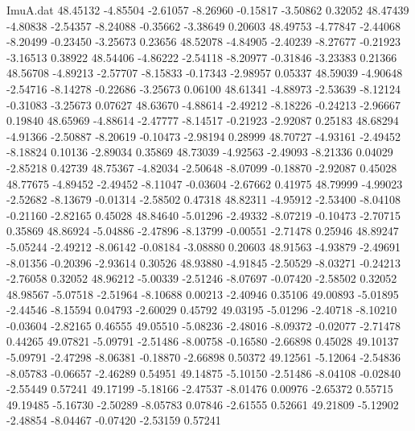 \begin{filecontents}{ImuA.dat}
  48.45132   -4.85504   -2.61057   -8.26960   -0.15817   -3.50862    0.32052
  48.47439   -4.80838   -2.54357   -8.24088   -0.35662   -3.38649    0.20603
  48.49753   -4.77847   -2.44068   -8.20499   -0.23450   -3.25673    0.23656
  48.52078   -4.84905   -2.40239   -8.27677   -0.21923   -3.16513    0.38922
  48.54406   -4.86222   -2.54118   -8.20977   -0.31846   -3.23383    0.21366
  48.56708   -4.89213   -2.57707   -8.15833   -0.17343   -2.98957    0.05337
  48.59039   -4.90648   -2.54716   -8.14278   -0.22686   -3.25673    0.06100
  48.61341   -4.88973   -2.53639   -8.12124   -0.31083   -3.25673    0.07627
  48.63670   -4.88614   -2.49212   -8.18226   -0.24213   -2.96667    0.19840
  48.65969   -4.88614   -2.47777   -8.14517   -0.21923   -2.92087    0.25183
  48.68294   -4.91366   -2.50887   -8.20619   -0.10473   -2.98194    0.28999
  48.70727   -4.93161   -2.49452   -8.18824    0.10136   -2.89034    0.35869
  48.73039   -4.92563   -2.49093   -8.21336    0.04029   -2.85218    0.42739
  48.75367   -4.82034   -2.50648   -8.07099   -0.18870   -2.92087    0.45028
  48.77675   -4.89452   -2.49452   -8.11047   -0.03604   -2.67662    0.41975
  48.79999   -4.99023   -2.52682   -8.13679   -0.01314   -2.58502    0.47318
  48.82311   -4.95912   -2.53400   -8.04108   -0.21160   -2.82165    0.45028
  48.84640   -5.01296   -2.49332   -8.07219   -0.10473   -2.70715    0.35869
  48.86924   -5.04886   -2.47896   -8.13799   -0.00551   -2.71478    0.25946
  48.89247   -5.05244   -2.49212   -8.06142   -0.08184   -3.08880    0.20603
  48.91563   -4.93879   -2.49691   -8.01356   -0.20396   -2.93614    0.30526
  48.93880   -4.91845   -2.50529   -8.03271   -0.24213   -2.76058    0.32052
  48.96212   -5.00339   -2.51246   -8.07697   -0.07420   -2.58502    0.32052
  48.98567   -5.07518   -2.51964   -8.10688    0.00213   -2.40946    0.35106
  49.00893   -5.01895   -2.44546   -8.15594    0.04793   -2.60029    0.45792
  49.03195   -5.01296   -2.40718   -8.10210   -0.03604   -2.82165    0.46555
  49.05510   -5.08236   -2.48016   -8.09372   -0.02077   -2.71478    0.44265
  49.07821   -5.09791   -2.51486   -8.00758   -0.16580   -2.66898    0.45028
  49.10137   -5.09791   -2.47298   -8.06381   -0.18870   -2.66898    0.50372
  49.12561   -5.12064   -2.54836   -8.05783   -0.06657   -2.46289    0.54951
  49.14875   -5.10150   -2.51486   -8.04108   -0.02840   -2.55449    0.57241
  49.17199   -5.18166   -2.47537   -8.01476    0.00976   -2.65372    0.55715
  49.19485   -5.16730   -2.50289   -8.05783    0.07846   -2.61555    0.52661
  49.21809   -5.12902   -2.48854   -8.04467   -0.07420   -2.53159    0.57241

\end{filecontents}
